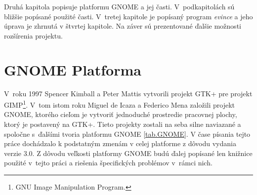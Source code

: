 \documentclass[12pt,oneside,final]{fithesis2}
\begin{document}
Druhá kapitola popisuje platformu GNOME a jej časti. V~podkapitolách sú bližšie popísané použité časti. V~tretej kapitole je popísaný program \emph{evince} a jeho úprava je zhrnutá v štvrtej kapitole. Na záver sú prezentované ďalšie možnosti rozšírenia projektu.

\chapter{GNOME Platforma}
V~roku 1997 Spencer Kimball a Peter Mattis vytvorili projekt GTK+ pre projekt GIMP\footnote{GNU Image Manipulation Program.}. V~tom istom roku Miguel de Icaza a Federico Mena založili projekt GNOME, ktorého cieľom je vytvoriť jednoduché prostredie pracovnej plochy, ktorý je postavený na GTK+. Tieto projekty zostali na seba silne naviazané a spoločne s~ďalšími tvoria platformu GNOME \ref{tab.GNOME}. V čase písania tejto práce dochádzalo k podstatným zmenám v celej platforme z dôvodu vydania verzie 3.0. Z dôvodu veľkosti platformy GNOME budú ďalej popísané len knižnice použité v~tejto práci a riešenia špecifických problémov v~rámci nich.
\end{document}
